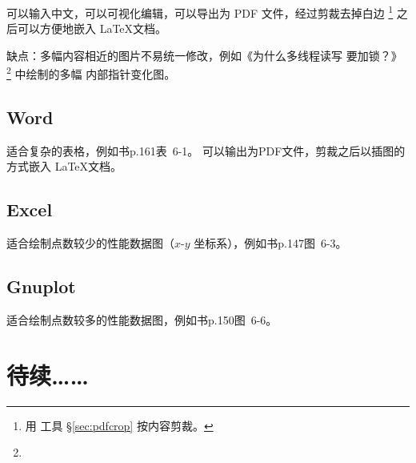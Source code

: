 可以输入中文，可以可视化编辑，可以导出为 PDF 文件，经过剪裁去掉白边
\footnote{用  工具 \S \ref{sec:pdfcrop} 按内容剪裁。}
之后可以方便地嵌入 \LaTeX 文档。

缺点：多幅内容相近的图片不易统一修改，例如《为什么多线程读写  要加锁？》%
\footnote{}
中绘制的多幅  内部指针变化图。

\subsection{Word}
适合复杂的表格，例如书p.161表~6-1。
可以输出为PDF文件，剪裁之后以插图的方式嵌入 \LaTeX 文档。

\subsection{Excel}
适合绘制点数较少的性能数据图（$x$-$y$ 坐标系），例如书p.147图~6-3。

\subsection{Gnuplot}
适合绘制点数较多的性能数据图，例如书p.150图~6-6。


\section{待续……}
